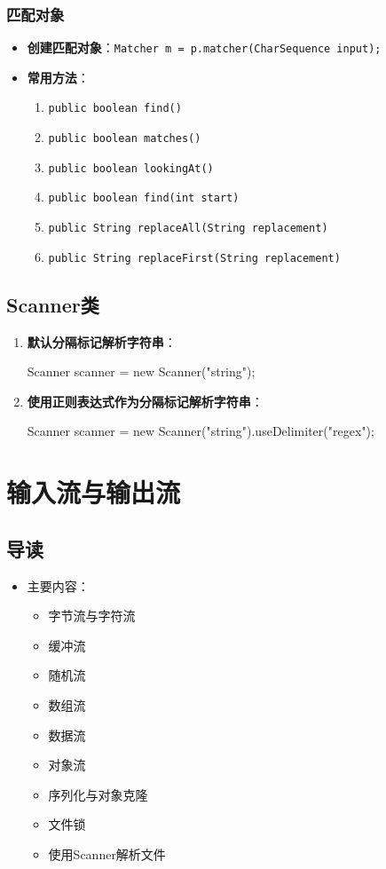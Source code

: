 \documentclass[a4paper, 10pt]{ctexart}
\begin{document}
\subsubsection{匹配对象}
\begin{itemize}
  \item \textbf{创建匹配对象}：\texttt{Matcher m = p.matcher(CharSequence input);}
  \item \textbf{常用方法}：
  \begin{enumerate}
    \item \texttt{public boolean find()}
    \item \texttt{public boolean matches()}
    \item \texttt{public boolean lookingAt()}
    \item \texttt{public boolean find(int start)}
    \item \texttt{public String replaceAll(String replacement)}
    \item \texttt{public String replaceFirst(String replacement)}
  \end{enumerate}
\end{itemize}

\subsection{Scanner类}
\begin{enumerate}
  \item \textbf{默认分隔标记解析字符串}：
  \begin{codeblock}
Scanner scanner = new Scanner("string");
  \end{codeblock}
  \item \textbf{使用正则表达式作为分隔标记解析字符串}：
  \begin{codeblock}
Scanner scanner = new Scanner("string").useDelimiter("regex");
  \end{codeblock}
\end{enumerate}

\section{输入流与输出流}

\subsection{导读}
\begin{itemize}
  \item 主要内容：
  \begin{itemize}
    \item 字节流与字符流
    \item 缓冲流
    \item 随机流
    \item 数组流
    \item 数据流
    \item 对象流
    \item 序列化与对象克隆
    \item 文件锁
    \item 使用Scanner解析文件
  \end{itemize}
\end{itemize}
\end{document}
